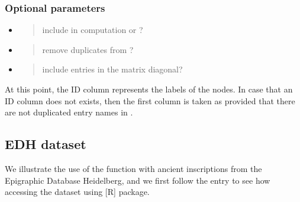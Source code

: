 \documentclass[a4paper,12pt,english]{sphinxhowto}
\begin{document}
\subsubsection{Optional parameters}
\label{\detokenize{EpigraphicNetwork:optional-parameters}}\begin{itemize}
\item {} 
\begin{quote}

include in computation  or ?
\end{quote}

\item {} 
\begin{quote}

remove duplicates from ?
\end{quote}

\item {} 
\begin{quote}

include entries in the matrix diagonal?
\end{quote}

\end{itemize}


At this point, the ID column represents the labels of the nodes. In
case that an ID column does not exists, then the first column is taken
as  provided that there are not duplicated entry names in .



\subsection{EDH dataset}
\label{\detokenize{EpigraphicNetwork:edh-dataset}}
We illustrate the use of the  function with ancient inscriptions from
the Epigraphic Database Heidelberg, and we first follow the entry {\hyperref[\detokenize{Epigraphic:edh}]{}}
to see how accessing the  dataset using  {[}R{]} package.


\begin{sphinxVerbatim}[commandchars=\\\{\},formatcom=\footnotesize]
 

 
\end{sphinxVerbatim}
\end{document}
